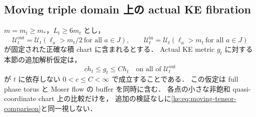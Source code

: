 \subsection{Moving triple domain 上の actual KE fibration}

\begin{definition}
\label{ke:moving-comparison}
$m=m_t\ge m_*$，$L_t\ge6m_t$ とし，
\[
 \mathcal U_t^{\mathrm{out}}=\mathcal U_t(\ell_a>m_t/2\ \text{for all }a\in J),
 \qquad
 \mathcal U_t^{\mathrm{in}}=\mathcal U_t(\ell_a>m_t\ \text{for all }a\in J)
\]
が固定された正確な積 chart に含まれるとする．
Actual KE metric $g_t$ に対する本節の追加解析仮定は，
\begin{equation}\label{ke:eq:moving-tensor-comparison}
 c h_t\le g_t\le C h_t
 \quad\text{on all of }\mathcal U_t^{\mathrm{out}}
\end{equation}
が $t$ に依存しない $0<c\le C<\infty$ で成立することである．
この仮定は full phase torus と Moser flow の buffer を同時に含む．
各点の小さな非飽和 quasi-coordinate chart 上の比較だけを，
追加の検証なしに\eqref{ke:eq:moving-tensor-comparison}と同一視しない．
\end{definition}


